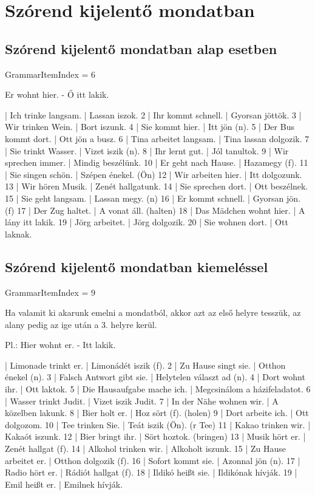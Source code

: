 \documentclass{article}
\newenvironment{desc}{\verbatim}{\endverbatim}
\newenvironment{exmp}{\verbatim}{\endverbatim}
\begin{document}
\section{Szórend kijelentő mondatban}

\subsection{Szórend kijelentő mondatban alap esetben}

GrammarItemIndex = 6

\begin{desc}
Er wohnt hier. - Ő itt lakik.
\end{desc}

\begin{exmp}
1 | Ich trinke langsam. | Lassan iszok.
2 | Ihr kommt schnell. | Gyorsan jöttök.
3 | Wir trinken Wein. | Bort iszunk.
4 | Sie kommt hier. | Itt jön (n).
5 | Der Bus kommt dort. | Ott jön a busz.
6 | Tina arbeitet langsam. | Tina lassan dolgozik.
7 | Sie trinkt Wasser. | Vizet iszik (n).
8 | Ihr lernt gut. | Jól tanultok.
9 | Wir sprechen immer. | Mindig beszélünk.
10 | Er geht nach Hause. | Hazamegy (f).
11 | Sie singen schön. | Szépen énekel. (Ön)
12 | Wir arbeiten hier. | Itt dolgozunk.
13 | Wir hören Musik. | Zenét hallgatunk.
14 | Sie sprechen dort. | Ott beszélnek.
15 | Sie geht langsam. | Lassan megy. (n)
16 | Er kommt schnell. | Gyorsan jön. (f)
17 | Der Zug haltet. | A vonat áll. (halten)
18 | Das Mädchen wohnt hier. | A lány itt lakik.
19 | Jörg arbeitet. | Jörg dolgozik.
20 | Sie wohnen dort. | Ott laknak.
\end{exmp}

\subsection{Szórend kijelentő mondatban kiemeléssel}

GrammarItemIndex = 9

\begin{desc}
Ha valamit ki akarunk emelni a mondatból, akkor azt az első helyre tesszük, az alany pedig az ige után a 3. helyre kerül.

Pl.: Hier wohnt er. - Itt lakik.
\end{desc}

\begin{exmp}
1 | Limonade trinkt er. | Limonádét iszik (f).
2 | Zu Hause singt sie. | Otthon énekel (n).
3 | Falsch Antwort gibt sie. | Helytelen választ ad (n).
4 | Dort wohnt ihr. | Ott laktok.
5 | Die Hausaufgabe mache ich. | Megcsinálom a házifeladatot.
6 | Wasser trinkt Judit. | Vizet iszik Judit.
7 | In der Nähe wohnen wir. | A közelben lakunk.
8 | Bier holt er. | Hoz sört (f). (holen)
9 | Dort arbeite ich. | Ott dolgozom.
10 | Tee trinken Sie. | Teát iszik (Ön). (r Tee)
11 | Kakao trinken wir. | Kakaót iszunk.
12 | Bier bringt ihr. | Sört hoztok. (bringen)
13 | Musik hört er. | Zenét hallgat (f).
14 | Alkohol trinken wir. | Alkoholt iszunk.
15 | Zu Hause arbeitet er. | Otthon dolgozik (f).
16 | Sofort kommt sie. | Azonnal jön (n).
17 | Radio hört er. | Rádiót hallgat (f).
18 | Ildikó heißt sie. | Ildikónak hívják.
19 | Emil heißt er. | Emilnek hívják.
\end{exmp}
\end{document}
